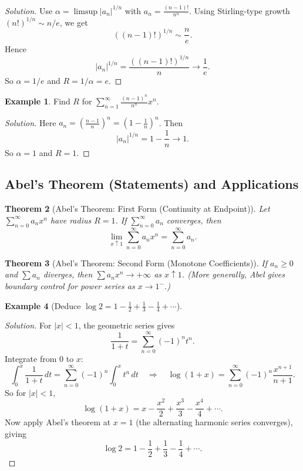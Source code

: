 \documentclass[12pt]{article}
\newtheorem{theorem}{Theorem}[section]
\theoremstyle{definition}
\newtheorem{example}[theorem]{Example}
\begin{document}
\begin{proof}[Solution]
Use $\alpha=\limsup |a_n|^{1/n}$ with $a_n=\frac{(n-1)!}{n^n}$.
Using Stirling-type growth $(n!)^{1/n}\sim n/e$, we get
\[
((n-1)!)^{1/n}\sim \frac{n}{e}.
\]
Hence
\[
|a_n|^{1/n} = \frac{((n-1)!)^{1/n}}{n}
\to \frac{1}{e}.
\]
So $\alpha=1/e$ and $R=1/\alpha=e$.
\end{proof}

\begin{example}
Find $R$ for $\displaystyle \sum_{n=1}^\infty \frac{(n-1)^n}{n^n} x^n$.
\end{example}

\begin{proof}[Solution]
Here $a_n=\left(\frac{n-1}{n}\right)^n = \left(1-\frac1n\right)^n$.
Then
\[
|a_n|^{1/n} = 1-\frac1n \to 1.
\]
So $\alpha=1$ and $R=1$.
\end{proof}

\subsection{Abel's Theorem (Statements) and Applications}

\begin{theorem}[Abel's Theorem: First Form (Continuity at Endpoint)]
Let $\sum_{n=0}^\infty a_n x^n$ have radius $R=1$. If $\sum_{n=0}^\infty a_n$ converges, then
\[
\lim_{x\uparrow 1}\sum_{n=0}^\infty a_n x^n = \sum_{n=0}^\infty a_n.
\]
\end{theorem}

\begin{theorem}[Abel's Theorem: Second Form (Monotone Coefficients)]
If $a_n\ge 0$ and $\sum a_n$ diverges, then $\sum a_n x^n \to +\infty$ as $x\uparrow 1$.
(More generally, Abel gives boundary control for power series as $x\to 1^-$.)
\end{theorem}

\begin{example}[Deduce $\log 2 = 1-\frac12+\frac13-\frac14+\cdots$]
\end{example}

\begin{proof}[Solution]
For $|x|<1$, the geometric series gives
\[
\frac{1}{1+t} = \sum_{n=0}^\infty (-1)^n t^n.
\]
Integrate from $0$ to $x$:
\[
\int_0^x \frac{1}{1+t}\,dt = \sum_{n=0}^\infty (-1)^n \int_0^x t^n\,dt
\quad\Rightarrow\quad
\log(1+x)=\sum_{n=0}^\infty (-1)^n \frac{x^{n+1}}{n+1}.
\]
So for $|x|<1$,
\[
\log(1+x)= x-\frac{x^2}{2}+\frac{x^3}{3}-\frac{x^4}{4}+\cdots.
\]
Now apply Abel's theorem at $x=1$ (the alternating harmonic series converges), giving
\[
\log 2 = 1-\frac12+\frac13-\frac14+\cdots.
\]
\end{proof}
\end{document}
